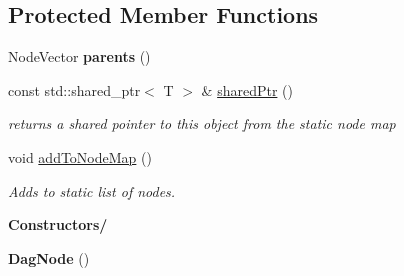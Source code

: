 \subsection*{Protected Member Functions}
\begin{DoxyCompactItemize}
\item 
\mbox{\label{classrev_1_1_dag_node_ab2935df93974db3f0ae79bd97f7ff49a}} 
Node\+Vector {\bfseries parents} ()
\item 
\mbox{\label{classrev_1_1_dag_node_a033ee383e299d32bdc4ada1888e5945f}} 
const std\+::shared\+\_\+ptr$<$ T $>$ \& \mbox{\hyperlink{classrev_1_1_dag_node_a033ee383e299d32bdc4ada1888e5945f}{shared\+Ptr}} ()
\begin{DoxyCompactList}\small\item\em returns a shared pointer to this object from the static node map \end{DoxyCompactList}\item 
\mbox{\label{classrev_1_1_dag_node_aed31306dd63371bfea15bba6d0f312b3}} 
void \mbox{\hyperlink{classrev_1_1_dag_node_aed31306dd63371bfea15bba6d0f312b3}{add\+To\+Node\+Map}} ()
\begin{DoxyCompactList}\small\item\em Adds to static list of nodes. \end{DoxyCompactList}\end{DoxyCompactItemize}
\begin{Indent}\textbf{ Constructors/}\par
\begin{DoxyCompactItemize}
\item 
\mbox{\label{classrev_1_1_dag_node_a31f36242bcb73469215278a5d0283b89}} 
{\bfseries Dag\+Node} ()
\end{DoxyCompactItemize}
\end{Indent}

